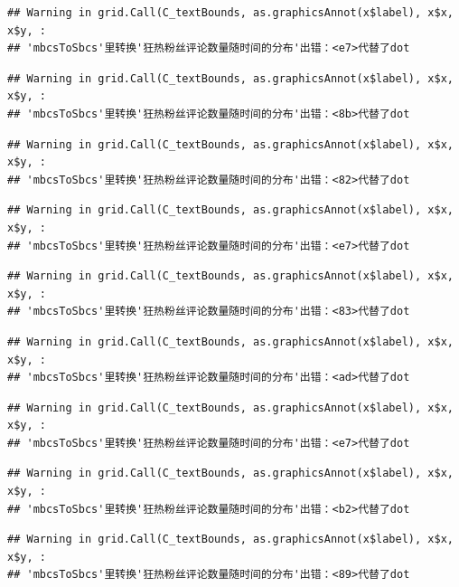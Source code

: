 \documentclass[
]{article}
\begin{document}
\begin{verbatim}
## Warning in grid.Call(C_textBounds, as.graphicsAnnot(x$label), x$x, x$y, :
## 'mbcsToSbcs'里转换'狂热粉丝评论数量随时间的分布'出错：<e7>代替了dot
\end{verbatim}

\begin{verbatim}
## Warning in grid.Call(C_textBounds, as.graphicsAnnot(x$label), x$x, x$y, :
## 'mbcsToSbcs'里转换'狂热粉丝评论数量随时间的分布'出错：<8b>代替了dot
\end{verbatim}

\begin{verbatim}
## Warning in grid.Call(C_textBounds, as.graphicsAnnot(x$label), x$x, x$y, :
## 'mbcsToSbcs'里转换'狂热粉丝评论数量随时间的分布'出错：<82>代替了dot
\end{verbatim}

\begin{verbatim}
## Warning in grid.Call(C_textBounds, as.graphicsAnnot(x$label), x$x, x$y, :
## 'mbcsToSbcs'里转换'狂热粉丝评论数量随时间的分布'出错：<e7>代替了dot
\end{verbatim}

\begin{verbatim}
## Warning in grid.Call(C_textBounds, as.graphicsAnnot(x$label), x$x, x$y, :
## 'mbcsToSbcs'里转换'狂热粉丝评论数量随时间的分布'出错：<83>代替了dot
\end{verbatim}

\begin{verbatim}
## Warning in grid.Call(C_textBounds, as.graphicsAnnot(x$label), x$x, x$y, :
## 'mbcsToSbcs'里转换'狂热粉丝评论数量随时间的分布'出错：<ad>代替了dot
\end{verbatim}

\begin{verbatim}
## Warning in grid.Call(C_textBounds, as.graphicsAnnot(x$label), x$x, x$y, :
## 'mbcsToSbcs'里转换'狂热粉丝评论数量随时间的分布'出错：<e7>代替了dot
\end{verbatim}

\begin{verbatim}
## Warning in grid.Call(C_textBounds, as.graphicsAnnot(x$label), x$x, x$y, :
## 'mbcsToSbcs'里转换'狂热粉丝评论数量随时间的分布'出错：<b2>代替了dot
\end{verbatim}

\begin{verbatim}
## Warning in grid.Call(C_textBounds, as.graphicsAnnot(x$label), x$x, x$y, :
## 'mbcsToSbcs'里转换'狂热粉丝评论数量随时间的分布'出错：<89>代替了dot
\end{verbatim}
\end{document}
